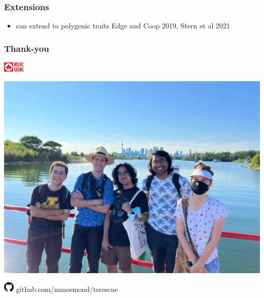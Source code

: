 \documentclass{beamer}
\begin{document}
\begin{frame}
	\frametitle{Extensions}

	\begin{itemize}
		\item can extend to polygenic traits {\tiny Edge and Coop 2019, Stern et al 2021}
	\end{itemize}

\end{frame}


\begin{frame}
	\frametitle{Thank-you}

	\begin{center}
		\includegraphics[width=1cm]{../images/nserc.png}

		\includegraphics[width=0.75\linewidth]{../images/leslie-lab.jpeg}


		\includegraphics[width=0.5cm]{../images/github.png} github.com/mmosmond/tsrescue
	\end{center}

\end{frame}



\end{document}
